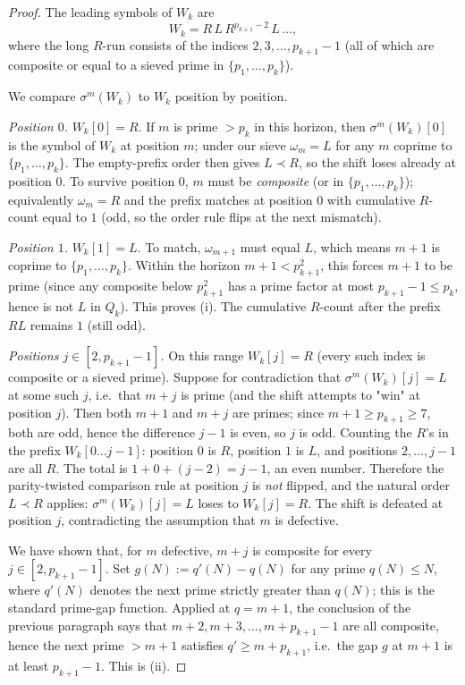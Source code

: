 \documentclass[11pt,a4paper]{article}
\theoremstyle{definition}
\begin{document}
\begin{proof}
The leading symbols of $W_k$ are
\[
    W_k = R\, L\, R^{p_{k+1} - 2}\, L\, \ldots,
\]
where the long $R$-run consists of the indices $2, 3, \ldots, p_{k+1} - 1$
(all of which are composite or equal to a sieved prime in $\{p_1, \ldots, p_k\}$).

We compare $\sigma^m(W_k)$ to $W_k$ position by position.

\emph{Position $0$.} $W_k[0] = R$. If $m$ is prime $> p_k$ in this
horizon, then $\sigma^m(W_k)[0]$ is the symbol of $W_k$ at position $m$;
under our sieve $\omega_m = L$ for any $m$ coprime to $\{p_1, \ldots, p_k\}$.
The empty-prefix order then gives $L \prec R$, so the shift loses
already at position $0$. To survive position $0$, $m$ must be
\emph{composite} (or in $\{p_1, \ldots, p_k\}$); equivalently
$\omega_m = R$ and the prefix matches at position $0$ with cumulative
$R$-count equal to $1$ (odd, so the order rule flips at the next
mismatch).

\emph{Position $1$.} $W_k[1] = L$. To match, $\omega_{m+1}$ must equal
$L$, which means $m + 1$ is coprime to $\{p_1, \ldots, p_k\}$. Within
the horizon $m + 1 < p_{k+1}^2$, this forces $m + 1$ to be prime (since
any composite below $p_{k+1}^2$ has a prime factor at most
$p_{k+1} - 1 \leq p_k$, hence is not $L$ in $Q_k$). This proves (i).
The cumulative $R$-count after the prefix $RL$ remains $1$ (still odd).

\emph{Positions $j \in [2, p_{k+1} - 1]$.} On this range $W_k[j] = R$
(every such index is composite or a sieved prime). Suppose for
contradiction that $\sigma^m(W_k)[j] = L$ at some such $j$, i.e.\ that
$m + j$ is prime (and the shift attempts to "win" at position $j$).
Then both $m + 1$ and $m + j$ are primes; since $m + 1 \geq p_{k+1} \geq 7$,
both are odd, hence the difference $j - 1$ is even, so $j$ is odd.
Counting the $R$'s in the prefix $W_k[0\ldots j-1]$: position $0$ is
$R$, position $1$ is $L$, and positions $2, \ldots, j-1$ are all $R$.
The total is $1 + 0 + (j - 2) = j - 1$, an even number. Therefore the
parity-twisted comparison rule at position $j$ is \emph{not} flipped,
and the natural order $L \prec R$ applies: $\sigma^m(W_k)[j] = L$ loses
to $W_k[j] = R$. The shift is defeated at position $j$, contradicting
the assumption that $m$ is defective.

We have shown that, for $m$ defective, $m + j$ is composite for every
$j \in [2, p_{k+1} - 1]$. Set $g(N) := q'(N) - q(N)$ for any prime
$q(N) \leq N$, where $q'(N)$ denotes the next prime strictly greater
than $q(N)$; this is the standard prime-gap function. Applied at
$q = m + 1$, the conclusion of the previous paragraph says that
$m + 2, m + 3, \ldots, m + p_{k+1} - 1$ are all composite, hence the
next prime $> m + 1$ satisfies $q' \geq m + p_{k+1}$, i.e.\ the gap
$g$ at $m + 1$ is at least $p_{k+1} - 1$. This is (ii).
\end{proof}
\end{document}
